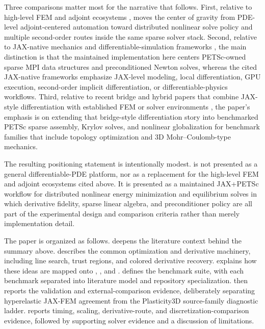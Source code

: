 \begin{table}[tbp]
  \centering
  \scriptsize
  \setlength{\tabcolsep}{3pt}
  
  \caption{State-of-the-art positioning of the framework families most relevant
  to this paper. The columns record source-supported workflow properties rather
  than subjective scores.}
  \label{tab:sota-comparison}
\end{table}

Three comparisons matter most for the narrative that follows. First, relative to
high-level FEM and adjoint ecosystems
\citep{logg2012fenicsbook,baratta2025dolfinx,farrell2013dolfinadjoint,mitusch2019pyadjoint,blauth2023cashocsv2},
\repo{} moves the center of gravity from PDE-level adjoint-centered automation toward
distributed nonlinear solve policy and multiple second-order routes inside the
same sparse solver stack. Second, relative to JAX-native mechanics and
differentiable-simulation frameworks
\citep{xue2023jaxfem,xue2026implicit,bode2025autopdex,hu2025jaxcpfem}, the main
distinction is that the maintained implementation here centers PETSc-owned
sparse MPI data structures and preconditioned Newton solves, whereas the cited
JAX-native frameworks emphasize JAX-level modeling, local differentiation, GPU
execution, second-order implicit differentiation, or differentiable-physics
workflows. Third, relative to recent bridge and hybrid papers that combine
JAX-style differentiation with established FEM or solver environments
\citep{yashchuk2023bringing,latyshev2025externaloperators,cattaneo2026jetsci},
the paper's emphasis is on extending that bridge-style differentiation story
into benchmarked PETSc sparse assembly, Krylov solves, and nonlinear
globalization for benchmark families that include topology optimization and 3D
Mohr--Coulomb-type mechanics.

The resulting positioning statement is intentionally modest. \repo{} is not
presented as a general differentiable-PDE platform, nor as a replacement for the
high-level FEM and adjoint ecosystems cited above. It is presented as a
maintained JAX+PETSc workflow for distributed nonlinear energy minimization and
equilibrium solves in which derivative fidelity, sparse linear algebra, and
preconditioner policy are all part of the experimental design and comparison
criteria rather than merely implementation detail.

The paper is organized as follows.  deepens the literature
context behind the summary above.  describes the common
optimization and derivative machinery, including line search, trust regions, and
colored derivative recovery.  explains how these ideas
are mapped onto \purejax{}, \fenics{}, and \jaxpetsc{}. 
defines the benchmark suite, with each benchmark separated into literature model
and repository specialization.  then reports the
validation and external-comparison evidence, deliberately separating
hyperelastic JAX-FEM agreement from the Plasticity3D source-family diagnostic
ladder.  reports timing, scaling, derivative-route,
and discretization-comparison evidence, followed by supporting solver evidence
and a discussion of limitations.
